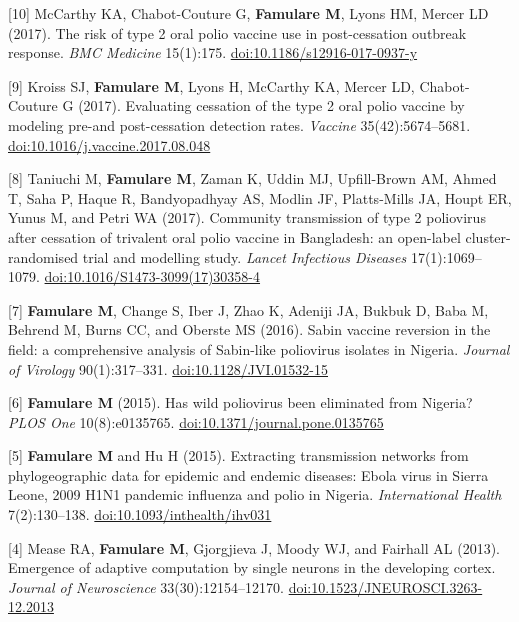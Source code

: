 \documentclass{article}
\begin{document}
\begin{llist}
\begin{items}
\item[{[10]}] McCarthy KA, Chabot-Couture G, \textbf{Famulare M}, Lyons HM, Mercer LD (2017). The risk of type 2 oral polio vaccine use in post-cessation outbreak response. \emph{BMC Medicine} 15(1):175. \href{https://doi.org/10.1186/s12916-017-0937-y}{doi:10.1186/s12916-017-0937-y}

\item[{[9]}] Kroiss SJ, \textbf{Famulare M}, Lyons H, McCarthy KA, Mercer LD, Chabot-Couture G (2017). Evaluating cessation of the type 2 oral polio vaccine by modeling pre-and post-cessation detection rates.  \emph{Vaccine} 35(42):5674--5681. \href{https://doi.org/10.1016/j.vaccine.2017.08.048}{doi:10.1016/j.vaccine.2017.08.048}

\item[{[8]}] Taniuchi M, \textbf{Famulare M}, Zaman K, Uddin MJ, Upfill-Brown AM, Ahmed T, Saha P, Haque R, Bandyopadhyay AS, Modlin JF, Platts-Mills JA, Houpt ER, Yunus M, and Petri WA (2017). Community transmission of type 2 poliovirus after cessation of trivalent oral polio vaccine in Bangladesh: an open-label cluster-randomised trial and modelling study.  \emph{Lancet Infectious Diseases} 17(1):1069--1079.  \href{https://doi.org/10.1016/S1473-3099(17)30358-4}{doi:10.1016/S1473-3099(17)30358-4}
	
\item[{[7]}] \textbf{Famulare M}, Change S, Iber J, Zhao K, Adeniji JA, Bukbuk D, Baba M, Behrend M, Burns CC, and Oberste MS (2016). Sabin vaccine reversion in the field: a comprehensive analysis of Sabin-like poliovirus isolates in Nigeria. \emph{Journal of Virology} 90(1):317--331. \href{https://doi.org/10.1128/JVI.01532-15}{doi:10.1128/JVI.01532-15}
	
\item[{[6]}] \textbf{Famulare M} (2015). Has wild poliovirus been eliminated from Nigeria? \emph{PLOS One} 10(8):e0135765. \href{https://doi.org/10.1371/journal.pone.0135765}{doi:10.1371/journal.pone.0135765}
	
\item[{[5]}] \textbf{Famulare M} and Hu H (2015). Extracting transmission networks from phylogeographic data for epidemic and endemic diseases: Ebola virus in Sierra Leone, 2009 H1N1 pandemic influenza and polio in Nigeria. \emph{International Health} 7(2):130--138. \href{https://doi.org/10.1093/inthealth/ihv031}{doi:10.1093/inthealth/ihv031}

\item[{[4]}] Mease RA, \textbf{Famulare M}, Gjorgjieva J, Moody WJ, and Fairhall AL (2013). Emergence of adaptive computation by single neurons in the developing cortex. \emph{Journal of Neuroscience} 33(30):12154--12170. \href{https://doi.org/10.1523/JNEUROSCI.3263-12.2013}{doi:10.1523/JNEUROSCI.3263-12.2013}
	

\end{items}
\end{llist}
\end{document}
